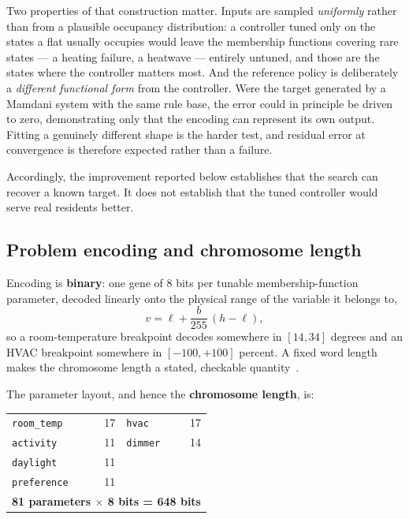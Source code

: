 Two properties of that construction matter. Inputs are sampled \emph{uniformly}
rather than from a plausible occupancy distribution: a controller tuned only on
the states a flat usually occupies would leave the membership functions covering
rare states --- a heating failure, a heatwave --- entirely untuned, and those are
the states where the controller matters most. And the reference policy is
deliberately a \emph{different functional form} from the controller. Were the
target generated by a Mamdani system with the same rule base, the error could in
principle be driven to zero, demonstrating only that the encoding can represent
its own output. Fitting a genuinely different shape is the harder test, and
residual error at convergence is therefore expected rather than a failure.

Accordingly, the improvement reported below establishes that the search can
recover a known target. It does not establish that the tuned controller would
serve real residents better.

\subsection{Problem encoding and chromosome length}

Encoding is \textbf{binary}: one gene of 8 bits per tunable membership-function
parameter, decoded linearly onto the physical range of the variable it belongs
to,
\begin{equation}
v = \ell + \frac{b}{255}\,(h - \ell),
\end{equation}
so a room-temperature breakpoint decodes somewhere in $[14, 34]$ degrees and an
HVAC breakpoint somewhere in $[-100, +100]$ percent. A fixed word length makes
the chromosome length a stated, checkable quantity~\cite{goldberg1989}.

The parameter layout, and hence the \textbf{chromosome length}, is:

\begin{center}
\small
\begin{tabular}{@{}lr@{\quad}lr@{}}
\texttt{room\_temp}  & 17 & \texttt{hvac}   & 17 \\
\texttt{activity}    & 11 & \texttt{dimmer} & 14 \\
\texttt{daylight}    & 11 & & \\
\texttt{preference}  & 11 & & \\
\multicolumn{4}{c}{\textbf{81 parameters $\times$ 8 bits = 648 bits}} \\
\end{tabular}
\end{center}

